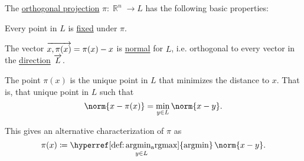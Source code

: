 \begin{proposition}\label{thm:def:orthogonal_projection}
  The \hyperref[def:orthogonal_projection]{orthogonal projection} \( \pi: \BbbR^n \to L \) has the following basic properties:

  \begin{thmenum}
     Every point in \( L \) is \hyperref[def:fixed_point]{fixed} under \( \pi \).

     The vector \( \overrightarrow{x,\pi(x)} = \pi(x) - x \) is \hyperref[def:normal_vector]{normal} for \( L \), i.e. orthogonal to every vector in the \hyperref[def:affine_subspace]{direction} \( \overrightarrow{L} \).

     The point \( \pi(x) \) is the unique point in \( L \) that minimizes the distance to \( x \). That is, that unique point in \( L \) such that
    \begin{equation*}
      \norm{ x - \pi(x) } = \min_{y \in L} \norm{ x - y }.
    \end{equation*}

    This gives an alternative characterization of \( \pi \) as
    \begin{equation}\label{eq:thm:def:orthogonal_projection/distance/argmin}
      \pi(x) \coloneqq \operatorname*{\hyperref[def:argmin_argmax]{argmin}}_{y \in L} \norm{ x - y }.
    \end{equation}
  \end{thmenum}
\end{proposition}
